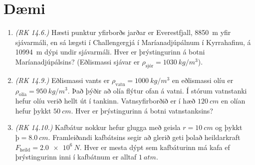 \ifdefined \wholebook \else\documentclass[oneside]{book}\usepackage{EdlBook}\graphicspath{{figures/}}
\begin{document}
\newpage

\section{Dæmi}

\begin{enumerate}[label = \textbf{Dæmi \thechapter.\arabic*.}]

\subsection*{Þrýstingur}

\item \textit{(RK 14.6.)} Hæsti punktur yfirborðs jarðar er Everestfjall, \SI{8850}{m} yfir sjávarmáli, en sá lægsti í Challengergjá í Maríanadjúpálnum í Kyrrahafinu, á \SI{10994}{m} dýpi undir sjávarmáli. Hver er þrýstingurinn á botni Maríanadjúpálsins? (Eðlismassi sjávar er $\rho_{\text{sjór}} = \SI{1030}{kg/m^3}$).

\item \textit{(RK 14.9.)} Eðlismassi vants er $\rho_{\text{vatn}} = \SI{1000}{kg/m^3}$ en eðlismassi olíu er $\rho_{\text{olía}} = \SI{950}{kg/m^3}$. Það þýðir að olía flýtur ofan á vatni. Í stórum vatnstanki hefur olíu verið hellt út í tankinn. Vatnsyfirborðið er í hæð $\SI{120}{cm}$ en olían hefur þykkt $\SI{50}{cm}$. Hver er þrýstingurinn á botni vatnstanksins?

\item \textit{(RK 14.10.)} Kafbátur nokkur hefur glugga með geisla $r = \SI{10}{cm}$ og þykkt $þ = \SI{8.0}{cm}$. Framleiðandi kafbátsins segir að glerið geti þolað heildarkraft $F_{\text{heild}} = \SI{2.0e6}{N}$. Hver er mesta dýpt sem kafbáturinn má kafa ef þrýstingurinn inni í kafbátnum er alltaf $\SI{1}{atm}$.


\end{enumerate}
\end{document}
